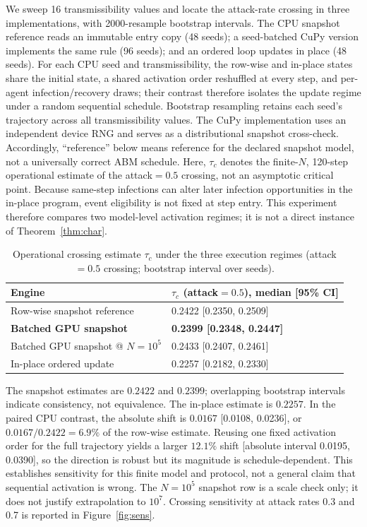 \documentclass[sigconf,nonacm,review,natbib=true]{acmart}
\theoremstyle{definition}
\theoremstyle{plain}
\theoremstyle{remark}
\begin{document}
We sweep 16 transmissibility values and locate the attack-rate crossing in
three implementations, with 2000-resample bootstrap intervals. The CPU
snapshot reference reads an immutable entry copy (48 seeds); a seed-batched
CuPy version implements the same rule (96 seeds); and an ordered loop updates
in place (48 seeds).
For each CPU seed and transmissibility, the row-wise and in-place states share
the initial state, a shared activation order reshuffled at every step, and
per-agent infection/recovery draws; their contrast therefore isolates the
update regime under a random sequential schedule. Bootstrap resampling retains
each seed's trajectory across all transmissibility values. The CuPy implementation
uses an independent device RNG and serves as a distributional snapshot
cross-check. Accordingly, ``reference'' below means reference for the declared
snapshot model, not a universally correct ABM schedule.
Here, $\tau_c$ denotes the finite-$N$, 120-step operational estimate of the
attack${=}0.5$ crossing, not an asymptotic critical point.
Because same-step infections can alter later infection opportunities in the
in-place program, event eligibility is not fixed at step entry. This experiment
therefore compares two model-level activation regimes; it is not a direct
instance of Theorem~\ref{thm:char}.

\begin{table}[t]
\centering\small
\caption{Operational crossing estimate $\tau_c$ under the three execution regimes
(attack${=}0.5$ crossing; bootstrap interval over seeds).}
\label{tab:tc}
\begin{tabular}{@{}l l@{}}
\toprule
Engine & $\tau_c$ (attack${=}0.5$), median [95\% CI] \\
\midrule
Row-wise snapshot reference & 0.2422 [0.2350, 0.2509] \\
\textbf{Batched GPU snapshot} & \textbf{0.2399 [0.2348, 0.2447]} \\
Batched GPU snapshot @ $N{=}10^5$ & 0.2433 [0.2407, 0.2461] \\
In-place ordered update & 0.2257 [0.2182, 0.2330] \\
\bottomrule
\end{tabular}
\end{table}

The snapshot estimates are $0.2422$ and $0.2399$; overlapping bootstrap
intervals indicate consistency, not equivalence. The in-place estimate is
$0.2257$. In the paired CPU contrast, the absolute shift is $0.0167$
[0.0108, 0.0236], or $0.0167/0.2422=6.9\%$ of the row-wise estimate. Reusing
one fixed activation order for the full trajectory yields a larger $12.1\%$
shift [absolute interval 0.0195, 0.0390], so the direction is robust but its
magnitude is schedule-dependent. This establishes sensitivity for this finite
model and protocol, not a general claim that sequential activation is wrong. The
$N{=}10^5$ snapshot row is a scale check only; it does not justify
extrapolation to $10^7$. Crossing sensitivity at attack rates 0.3 and 0.7 is
reported in Figure~\ref{fig:sens}.
\end{document}
